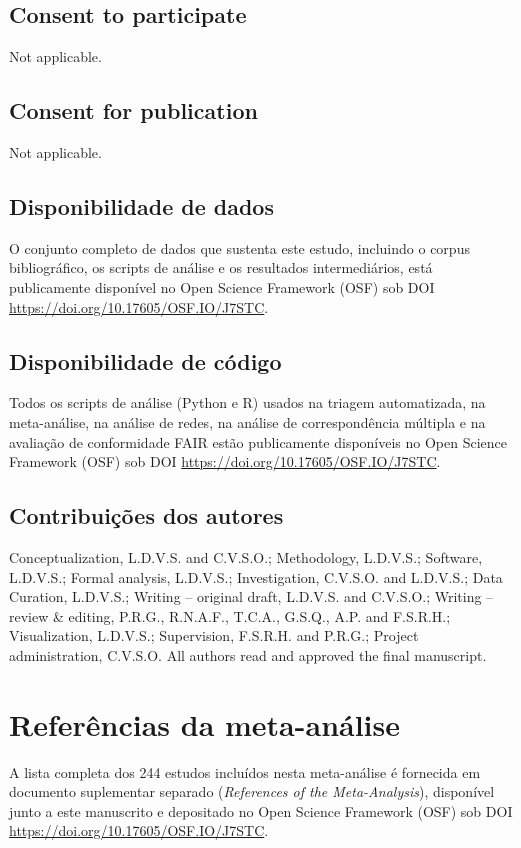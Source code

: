 \documentclass[lineno,pdflatex,sn-apa]{sn-jnl}%
\begin{document}
\subsection*{Consent to participate}

Not applicable.

\subsection*{Consent for publication}

Not applicable.

\subsection*{Disponibilidade de dados}

O conjunto completo de dados que sustenta este estudo, incluindo o corpus bibliográfico, os scripts de análise e os resultados intermediários, está publicamente disponível no Open Science Framework (OSF) sob DOI \url{https://doi.org/10.17605/OSF.IO/J7STC}.

\subsection*{Disponibilidade de código}

Todos os scripts de análise (Python e R) usados na triagem automatizada, na meta-análise, na análise de redes, na análise de correspondência múltipla e na avaliação de conformidade FAIR estão publicamente disponíveis no Open Science Framework (OSF) sob DOI \url{https://doi.org/10.17605/OSF.IO/J7STC}.

\subsection*{Contribuições dos autores}

Conceptualization, L.D.V.S. and C.V.S.O.; Methodology, L.D.V.S.; Software, L.D.V.S.; Formal analysis, L.D.V.S.; Investigation, C.V.S.O. and L.D.V.S.; Data Curation, L.D.V.S.; Writing -- original draft, L.D.V.S. and C.V.S.O.; Writing -- review \& editing, P.R.G., R.N.A.F., T.C.A., G.S.Q., A.P. and F.S.R.H.; Visualization, L.D.V.S.; Supervision, F.S.R.H. and P.R.G.; Project administration, C.V.S.O. All authors read and approved the final manuscript.



\section*{Referências da meta-análise}

A lista completa dos 244 estudos incluídos nesta meta-análise é fornecida em documento suplementar separado (\textit{References of the Meta-Analysis}), disponível junto a este manuscrito e depositado no Open Science Framework (OSF) sob DOI \url{https://doi.org/10.17605/OSF.IO/J7STC}.
\end{document}
